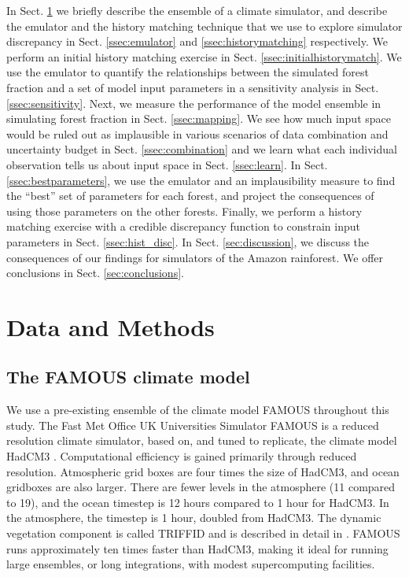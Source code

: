 \documentclass[esd, article]{copernicus} %
\begin{document}
In Sect. \ref{sec:dataandmethods} we briefly describe the ensemble of a climate simulator, and describe the emulator and the history matching technique that we use to explore simulator discrepancy in Sect. \ref{ssec:emulator} and \ref{ssec:historymatching} respectively. We perform an initial history matching exercise in Sect. \ref{ssec:initialhistorymatch}. We use the emulator to quantify the relationships between the simulated forest fraction and a set of model input parameters in a sensitivity analysis in Sect. \ref{ssec:sensitivity}. Next, we measure the performance of the model ensemble in simulating forest fraction in Sect. \ref{ssec:mapping}. We see how much input space would be ruled out as implausible in various scenarios of data combination and uncertainty budget in Sect. \ref{ssec:combination} and we learn what each individual observation tells us about input space in Sect. \ref{ssec:learn}. In Sect. \ref{ssec:bestparameters}, we use the emulator and an implausibility measure to find the ``best'' set of parameters for each forest, and project the consequences of using those parameters on the other forests. Finally, we perform a history matching exercise with a credible discrepancy function to constrain input parameters in Sect. \ref{ssec:hist_disc}. In Sect. \ref{sec:discussion}, we discuss the consequences of our findings for simulators of the Amazon rainforest. We offer conclusions in Sect. \ref{sec:conclusions}.


\section{Data and Methods}\label{sec:dataandmethods}

\subsection{The FAMOUS climate model}\label{subsec:FAMOUS}

We use a pre-existing ensemble of the climate model FAMOUS throughout this study. The Fast Met Office UK Universities Simulator FAMOUS \citep{jones2005systematic,smith2008famous} is a reduced resolution climate simulator, based on, and tuned to replicate, the climate model HadCM3 \citep{gordon2000simulation,pope2000impact}. Computational efficiency is gained primarily through reduced resolution. Atmospheric grid boxes are four times the size of HadCM3, and ocean gridboxes are also larger. There are fewer levels in the atmosphere (11 compared to 19), and the ocean timestep is 12 hours compared to 1 hour for HadCM3. In the atmosphere, the timestep is 1 hour, doubled from HadCM3. The dynamic vegetation component is called TRIFFID and is described in detail in \cite{cox2001description}.  FAMOUS runs approximately ten times faster than HadCM3, making it ideal for running large ensembles, or long integrations, with modest supercomputing facilities.
\end{document}
